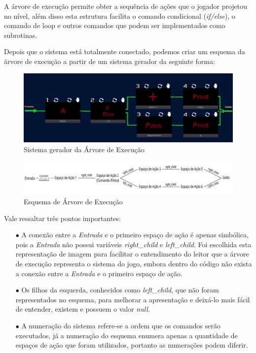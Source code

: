 A árvore de execução permite obter a sequência de ações que o jogador projetou
no nível, além disso esta estrutura facilita o comando condicional 
(\textit{if/else}), o comando de loop e outros comandos que podem ser 
implementados como subrotinas.

Depois que o sistema está totalmente conectado, podemos criar um esquema da
árvore de execução a partir de um sistema gerador da seguinte forma:

\begin{figure}[H]
    \includegraphics[width=\textwidth]{../figuras/sistema_conectado_arvore_execucao.png}
    \caption{Sistema gerador da Árvore de Execução}
\end{figure}

\begin{figure}[H]
    \includegraphics[width=\textwidth]{../figuras/arvore_execucao_redim.png}
    \caption{Esquema de Árvore de Execução}
\end{figure}

Vale ressaltar três pontos importantes:

\begin{itemize}
    \item[$\bullet$]
        A conexão entre a \textit{Entrada} e o primeiro espaço de ação é apenas 
        simbólica, pois a \textit{Entrada} não possui variáveis 
        \textit{right\_child} e \textit{left\_child}. Foi escolhida esta 
        representação de imagem para facilitar o entendimento do leitor que a 
        árvore de execução representa o sistema do jogo, embora dentro do código
        não exista a conexão entre a \textit{Entrada} e o primeiro espaço de 
        ação.
    \item[$\bullet$]
        Os filhos da esquerda, conhecidos como \textit{left\_child}, que 
        não foram representados no esquema, para melhorar a apresentação e 
        deixá-lo mais fácil de entender, existem e possuem o valor 
        \textit{null}.
    \item[$\bullet$]
        A numeração do sistema refere-se a ordem que os comandos serão 
        executados, já a numeração do esquema enumera apenas a quantidade
        de espaços de ação que foram utilizados, portanto as numerações
        podem diferir.
\end{itemize} 

